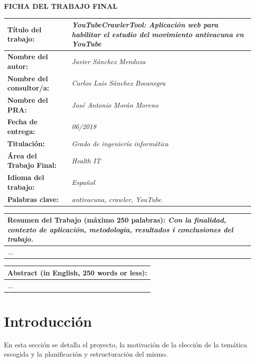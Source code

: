\documentclass[11pt,a4paper]{article}
\begin{document}
\begin{center}
\textbf{FICHA DEL TRABAJO FINAL}
\end{center}
\begin{tabularx}{\textwidth}{|X|X|}
\hline 
\textbf{Título del trabajo:} &\cellcolor{gray!25} \textit{YouTubeCrawlerTool: Aplicación web para habilitar el estudio del movimiento antivacuna en YouTube} \\ 
\hline 
\textbf{Nombre del autor:} &\cellcolor{gray!25} \textit{Javier Sánchez Mendoza} \\ 
\hline 
\textbf{Nombre del consultor/a:} &\cellcolor{gray!25} \textit{Carlos Luis Sánchez Bocanegra} \\ 
\hline 
\textbf{Nombre del PRA:} &\cellcolor{gray!25} \textit{José Antonio Morán Moreno} \\ 
\hline 
\textbf{Fecha de entrega:} &\cellcolor{gray!25} \textit{06/2018} \\ 
\hline 
\textbf{Titulación:} &\cellcolor{gray!25} \textit{Grado de ingeniería informática} \\ 
\hline 
\textbf{Área del Trabajo Final:} &\cellcolor{gray!25} \textit{Health IT} \\ 
\hline 
\textbf{Idioma del trabajo:} &\cellcolor{gray!25} \textit{Español} \\ 
\hline 
\textbf{Palabras clave:} &\cellcolor{gray!25} \textit{antivacuna, crawler, YouTube.} \\ 
\hline
\end{tabularx} 
\begin{tabularx}{\textwidth}{|X|}
\textbf{Resumen del Trabajo (máximo 250 palabras):} \textit{Con la finalidad, contexto de aplicación, metodología, resultados i conclusiones del trabajo.} \\ 
\hline 
\cellcolor{gray!25} \textit{...} \\
\hline 
\end{tabularx} 
\newpage 


\begin{tabularx}{\textwidth}{|X|}
\hline 
\textbf{Abstract (in English, 250 words or less):} \\ 
\hline 
\cellcolor{gray!25} \textit{...} \\
\hline 
\end{tabularx} 
\newpage 


\tableofcontents
\newpage


\listoffigures
\newpage


\section{Introducción}
En esta sección se detalla el proyecto, la motivación de la elección de la temática escogida y la planificación y estructuración del mismo.
\end{document}
